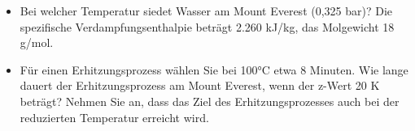 \documentclass[a4paper,11pt]{article}
\newif\ifshowme
\begin{document}
\begin{itemize}
\item 
Bei welcher Temperatur siedet Wasser am Mount Everest (0,325 bar)? Die spezifische
Verdampfungsenthalpie beträgt 2.260 kJ/kg, das Molgewicht 18 g/mol.
\ifshowme
\antwort{
\begin{align*}
\ln(\frac{p_2}{p_1})\cdot \frac{R}{\Delta h_{vM}}+\frac{1}{T_2}&=\frac{1}{T_1} \\
\ln(\frac{101.325~\text{Pa}}{32.500~\text{Pa}}) \cdot \frac{8,314 ~\text{J/(mol K)}}{2,26 \cdot 10^6 ~\text{J/kg} \cdot 0,018 ~\text{kg/mol}}+\frac{1}{373,15~\text{K}}&=2,915 \cdot 10^{-3}~\text{K} \quad | :\frac{1}{x} \\ 
&=343 ~\text{K}
\end{align*} 
}
\else
\fi
\item Für einen Erhitzungsprozess wählen Sie bei 100°C etwa 8 Minuten. Wie lange dauert der Erhitzungsprozess am Mount Everest, wenn der z-Wert 20 K beträgt? Nehmen Sie an, dass
das Ziel des Erhitzungsprozesses auch bei der reduzierten Temperatur erreicht wird. 
\ifshowme
\antwort{
\begin{align*}
F_1 &= F_2 \cdot 10^{\frac{T_2-T_1}{z}} \\
F_1 &= 8~\text{min} \cdot 10^{\frac{373,15 ~\text{K}-343 ~\text{K}}{20 ~\text{K}}} \\
 &= 257,38 ~\text{min}
\end{align*}


}



\else
\fi

\end{itemize}
\end{document}
